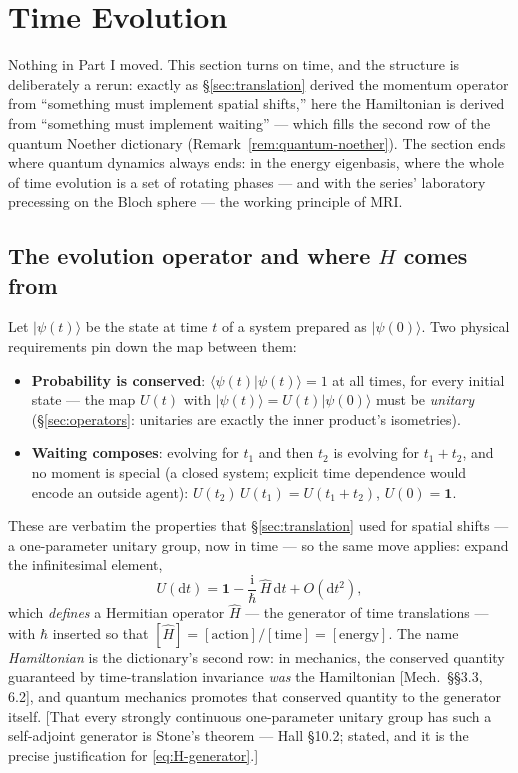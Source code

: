 \documentclass[11pt]{article}
\theoremstyle{plain}
\theoremstyle{definition}
\theoremstyle{remark}
\newcommand{\dd}{\mathrm{d}}
\newcommand{\ii}{\mathrm{i}}
\newcommand{\op}[1]{\hat{#1}}
\newcommand{\idop}{\mathbf{1}}  %
\newcommand{\ket}[1]{\lvert #1 \rangle}
\newcommand{\braket}[2]{\langle #1 | #2 \rangle}
\begin{document}
\section{Time Evolution}
\label{sec:evolution}

Nothing in Part I moved. This section turns on time, and the
structure is deliberately a rerun: exactly as \S\ref{sec:translation}
derived the momentum operator from ``something must implement
spatial shifts,'' here the Hamiltonian is derived from ``something
must implement waiting'' --- which fills the second
row of the quantum Noether dictionary
(Remark~\ref{rem:quantum-noether}). The
section ends where quantum dynamics always ends: in the energy
eigenbasis, where the whole of time evolution is a set of rotating
phases --- and with the series' laboratory precessing on the Bloch
sphere --- the working principle of MRI.

\subsection{The evolution operator and where $H$ comes from}
\label{sec:evolution-operator}

Let $\ket{\psi(t)}$ be the state at time $t$ of a system prepared as
$\ket{\psi(0)}$. Two physical requirements pin down the map between
them:
\begin{itemize}
  \item \textbf{Probability is conserved}: $\braket{\psi(t)}{\psi(t)}
  = 1$ at all times, for every initial state --- the map
  $U(t)$ with $\ket{\psi(t)} = U(t)\ket{\psi(0)}$ must be
  \emph{unitary} (\S\ref{sec:operators}: unitaries are exactly the
  inner product's isometries).
  \item \textbf{Waiting composes}: evolving for $t_1$ and then $t_2$
  is evolving for $t_1 + t_2$, and no moment is special (a closed
  system; explicit time dependence would encode an outside agent):
  $U(t_2)\,U(t_1) = U(t_1 + t_2)$, $U(0) = \idop$.
\end{itemize}
These are verbatim the properties that \S\ref{sec:translation} used
for spatial shifts --- a one-parameter unitary group, now in time
--- so the same move applies: expand the infinitesimal element,
\begin{equation}
  U(\dd t)
  = \idop - \frac{\ii}{\hbar}\,\op H\,\dd t + O(\dd t^2),
  \label{eq:H-generator}
\end{equation}
which \emph{defines} a Hermitian operator $\op H$ --- the generator
of time translations --- with $\hbar$ inserted so that
$[\op H] = [\text{action}]/[\text{time}] = [\text{energy}]$. The
name \emph{Hamiltonian} is the dictionary's second row: in mechanics,
the conserved quantity guaranteed by time-translation invariance
\emph{was} the Hamiltonian [Mech.\ \S\S3.3, 6.2], and quantum
mechanics
promotes that conserved quantity to the generator itself. [That
every strongly continuous one-parameter unitary group has such a
self-adjoint generator is Stone's theorem --- Hall \S10.2; stated,
and it is the precise justification for \eqref{eq:H-generator}.]
\end{document}
